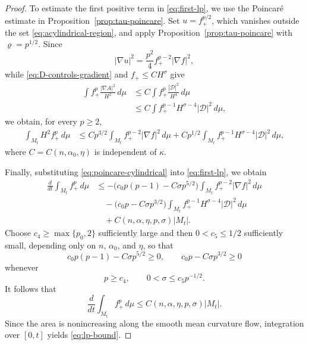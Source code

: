 \documentclass[10pt,a4paper]{amsart}
\begin{document}
\begin{proof}
To estimate the first positive term in \eqref{eq:first-lp}, we use the Poincar\'e estimate in Proposition~\ref{prop:tau-poincare}. Set $u=f_+^{p/2}$, which vanishes
outside the set \eqref{eq:acylindrical-region}, and apply
Proposition~\ref{prop:tau-poincare} with $\varrho=p^{1/2}$.  Since
\begin{equation*}
 |\nabla u|^2=\frac{p^2}{4}f_+^{p-2}|\nabla f|^2,
\end{equation*}
while \eqref{eq:D-controls-gradient} and $f_+\leq CH^\sigma$ give
\begin{align*}
 \int f_+^p\frac{|\nabla A|^2}{H^2}\,d\mu
 &\leq C\int f_+^p\frac{|\mathcal D|^2}{H^4}\,d\mu\\
 &\leq C\int f_+^{p-1}H^{\sigma-4}|\mathcal D|^2\,d\mu,
\end{align*}
we obtain, for every $p\geq2$,
\begin{align}
 \int_{M_t}H^2f_+^p\,d\mu
 &\leq Cp^{3/2}\int_{M_t}f_+^{p-2}|\nabla f|^2\,d\mu
 +Cp^{1/2}\int_{M_t}f_+^{p-1}H^{\sigma-4}
              |\mathcal D|^2\,d\mu,
 \label{eq:poincare-cylindrical}
\end{align}
where $C=C(n,\alpha_0,\eta)$ is independent of $\kappa$.

Finally, substituting \eqref{eq:poincare-cylindrical} into
\eqref{eq:first-lp}, we obtain
\begin{align*}
 \frac{d}{dt}\int_{M_t}f_+^p\,d\mu
 &\leq
 -\bigl(c_0p(p-1)-C\sigma p^{5/2}\bigr)
 \int_{M_t}f_+^{p-2}|\nabla f|^2\,d\mu\\
 &\quad
 -\bigl(c_0p-C\sigma p^{3/2}\bigr)
 \int_{M_t}f_+^{p-1}H^{\sigma-4}
 |\mathcal D|^2\,d\mu\\
 &\quad
 +C(n,\alpha,\eta,p,\sigma)|M_t|.
\end{align*}
Choose $c_4\geq\max\{p_0,2\}$ sufficiently large and then
$0<c_5\leq1/2$ sufficiently small, depending only on $n$, $\alpha_0$, and
$\eta$, so that
\begin{equation*}
 c_0p(p-1)-C\sigma p^{5/2}\geq0,
 \qquad
 c_0p-C\sigma p^{3/2}\geq0
\end{equation*}
whenever
\begin{equation*}
 p\geq c_4,
 \qquad
 0<\sigma\leq c_5p^{-1/2}.
\end{equation*}
It follows that
\begin{equation*}
 \frac{d}{dt}\int_{M_t}f_+^p\,d\mu
 \leq C(n,\alpha,\eta,p,\sigma)|M_t|.
\end{equation*}
Since the area is nonincreasing along the smooth mean curvature flow,
integration over $[0,t]$ yields  \eqref{eq:lp-bound}.
\end{proof}
\end{document}
